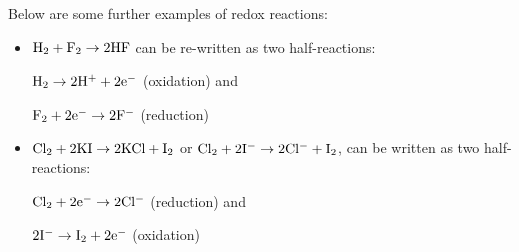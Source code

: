 Below are some further examples of redox reactions:

\begin{itemize}
\item{$\rm{H_{2} + F_{2} \rightarrow 2HF}$ can be re-written as two half-reactions:
\begin{center}
$\rm{H_{2} \rightarrow 2H^{+} + 2e^{-}}$ (oxidation) and

$\rm{F_{2} + 2e^{-} \rightarrow 2F^{-}}$ (reduction)
\end{center}
}

\item{$\rm{Cl_{2} + 2KI \rightarrow 2KCl + I_{2}}$ or $\rm{Cl_{2} + 2I^{-} \rightarrow 2Cl^{-} + I_{2}}$, can be written as two half-reactions:
\begin{center}
$\rm{Cl_{2} + 2e^{-} \rightarrow 2Cl^{-}}$ (reduction) and

$\rm{2I^{-} \rightarrow I_{2} + 2e^{-}}$ (oxidation)
\end{center}
}
\end{itemize}


